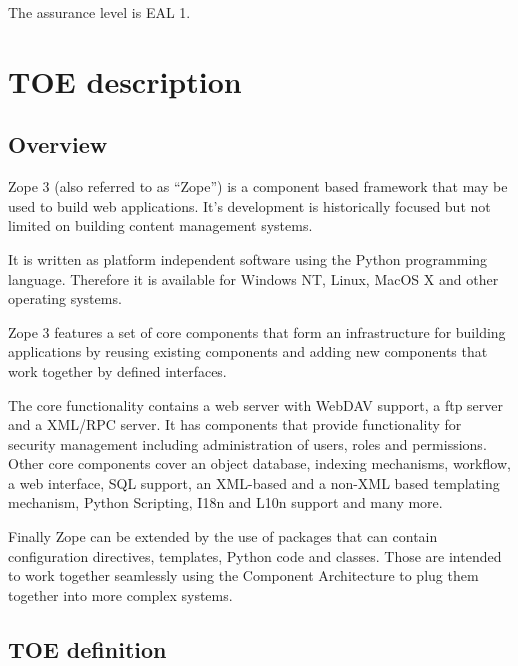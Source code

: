 \documentclass[10pt,a4paper,english]{book}
\begin{document}
The assurance level is EAL 1.



\hypertarget{toe-description}{}
\chapter{TOE description}



\hypertarget{overview}{}
\section{Overview}

Zope 3 (also referred to as ``Zope'') is a component based framework that may be
used to build web applications. It's development is historically focused but
not limited on building content management systems.

It is written as platform independent software using the Python programming
language. Therefore it is available for Windows NT, Linux, MacOS X and other
operating systems.

Zope 3 features a set of core components that form an infrastructure for 
building applications by reusing existing components and adding new components
that work together by defined interfaces.

The core functionality contains a web server with WebDAV support, a ftp server
and a XML/RPC server.  It has components that provide functionality for
security management including administration of users, roles and permissions.
Other core components cover an object database, indexing mechanisms,
workflow, a web interface, SQL support, an XML-based and a non-XML based templating
mechanism, Python Scripting, I18n and L10n support and many more.

Finally Zope can be extended by the use of packages that can contain
configuration directives, templates, Python code and classes. Those are
intended to work together seamlessly using the Component Architecture to plug
them together into more complex systems.



\hypertarget{toe-definition}{}
\section{TOE definition}
\end{document}
